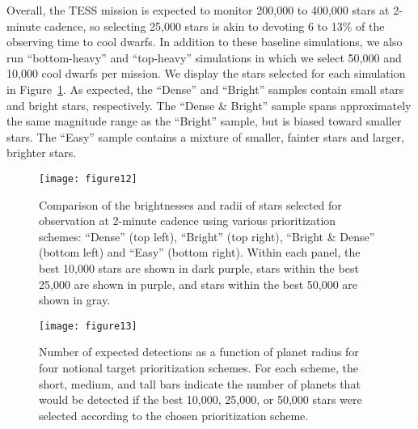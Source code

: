 \documentclass[twocolumn]{aastex62}
\begin{document}
Overall, the TESS mission is expected to monitor 200,000 to 400,000 stars at 2-minute cadence, so selecting 25,000 stars is akin to devoting 6 to 13\% of the observing time to cool dwarfs. In addition to these baseline simulations, we also run ``bottom-heavy'' and ``top-heavy'' simulations in which we select 50,000 and 10,000 cool dwarfs per mission. We display the stars selected for each simulation in Figure~\ref{fig:stars_selected}. As expected, the ``Dense'' and ``Bright'' samples contain small stars and bright stars, respectively. The ``Dense \& Bright'' sample spans approximately the same magnitude range as the ``Bright'' sample, but is biased toward smaller stars. The ``Easy'' sample contains a mixture of smaller, fainter stars and larger, brighter stars.

\begin{figure}[tbp]
    \centering
     \texttt{[image: figure12]}\\
    \caption{Comparison of the brightnesses and radii of stars selected for observation at 2-minute cadence using various prioritization schemes: ``Dense'' (top left), ``Bright'' (top right), ``Bright \& Dense'' (bottom left) and ``Easy'' (bottom right). Within each panel, the best 10,000 stars are shown in dark purple, stars within the best 25,000 are shown in purple, and stars within the best 50,000 are shown in gray.} \label{fig:stars_selected}
\end{figure}

\begin{figure}[tbp]
    \centering
     \texttt{[image: figure13]}\\
    \caption{Number of expected detections as a function of planet radius for four notional target prioritization schemes. For each scheme, the short, medium, and tall bars indicate the number of planets that would be detected if the best 10,000, 25,000, or 50,000 stars were selected according to the chosen prioritization scheme.} \label{fig:yield_comparison}
\end{figure}
\end{document}
